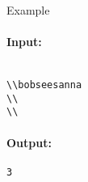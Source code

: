 Example
\paragraph{\textbf{    Input:   }}
\begin{verbatim}

\\bobseesanna
\\
\\\end{verbatim}

\paragraph{   Output:  }
\begin{verbatim}
3\end{verbatim}